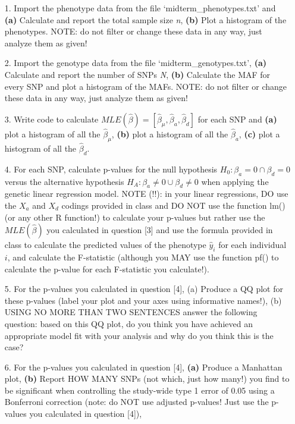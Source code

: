 \documentclass[letterpaper, 11pt]{article}
\begin{document}
\begin{itemize} 
\item[1.] Import the phenotype data from the file `midterm\_phenotypes.txt' and \textbf{(a)} Calculate and report the total sample size \textit{n}, \textbf{(b)} Plot a histogram of the phenotypes.  NOTE: do not filter or change these data in any way, just analyze them as given!
 
\item[2.] Import the genotype data from the file `midterm\_genotypes.txt', \textbf{(a)} Calculate and report the number of SNPs \textit{N}, \textbf{(b)} Calculate the MAF for every SNP and plot a histogram of the MAFs. NOTE: do not filter or change these data in any way, just analyze them as given!

\item[3.] Write code to calculate $MLE(\hat{\beta}) = [\hat{\beta}_\mu, \hat{\beta}_a, \hat{\beta}_d]$ for each SNP and \textbf{(a)} plot a histogram of all the $\hat{\beta}_\mu$, \textbf{(b)} plot a histogram of all the $\hat{\beta}_a$, \textbf{(c)} plot a histogram of all the $\hat{\beta}_d$.

\item[4.]  For each SNP, calculate p-values for the null hypothesis $H_0: \beta_a = 0 \cap \beta_d=0$ versus the alternative hypothesis $H_A: \beta_a \neq 0 \cup \beta_d \neq 0$ when applying the genetic linear regression model.  NOTE (!!): in your linear regressions, DO use the $X_a$ and $X_d$ codings provided in class and DO NOT use the function lm() (or any other R function!) to calculate your p-values but rather use the $MLE(\hat{\beta})$ you calculated in question [3] and use the formula provided in class to calculate the predicted values of the phenotype $\hat{y}_i$ for each individual $i$, and calculate the F-statistic (although you MAY use the function pf() to calculate the p-value for each F-statistic you calculate!). 

\item[5.] For the p-values you calculated in question [4], (a) Produce a QQ plot for these p-values (label your plot and your axes using informative names!), (b) USING NO MORE THAN TWO SENTENCES answer the following question: based on this QQ plot, do you think you have achieved an appropriate model fit with your analysis and why do you think this is the case?

\item[6.]  For the p-values you calculated in question [4], \textbf{(a)} Produce a Manhattan plot, \textbf{(b)} Report HOW MANY SNPs (not which, just how many!) you find to be significant when controlling the study-wide type 1 error of 0.05 using a Bonferroni correction (note: do NOT use adjusted p-values!  Just use the p-values you calculated in question [4]), 


\end{itemize}
\end{document}
